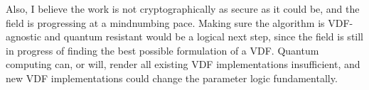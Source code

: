 Also, I believe the work is not cryptographically as secure as it could be, and the field is progressing at a mindnumbing pace. Making sure the algorithm is VDF-agnostic and quantum resistant would be a logical next step, since the field is still in progress of finding the best possible formulation of a VDF. Quantum computing can, or will, render all existing VDF implementations insufficient, and new VDF implementations could change the parameter logic fundamentally.
